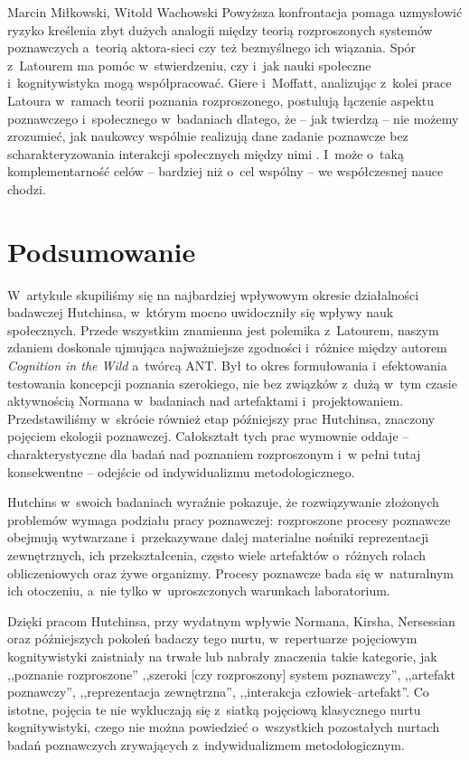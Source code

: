 \begin{artplenv2auth}{Marcin Miłkowski, Witold Wachowski}
Powyższa konfrontacja pomaga uzmysłowić ryzyko kreślenia zbyt dużych analogii między teorią rozproszonych systemów poznawczych a~teorią aktora-sieci czy też bezmyślnego ich wiązania. Spór z~Latourem ma pomóc w~stwierdzeniu, czy i~jak nauki społeczne i~kognitywistyka mogą współpracować. Giere i~Moffatt, analizując z~kolei prace Latoura w~ramach teorii poznania rozproszonego, postulują łączenie aspektu poznawczego i~społecznego w~badaniach dlatego, że -- jak twierdzą -- nie możemy zrozumieć, jak naukowcy wspólnie realizują dane zadanie poznawcze bez scharakteryzowania interakcji społecznych między nimi
\parencite[][s.~4–8]{giere_distributed_2003}. %
 I~może o~taką komplementarność celów -- bardziej niż o~cel wspólny -- we współczesnej nauce chodzi.

\section{Podsumowanie}

W~artykule skupiliśmy się na najbardziej wpływowym okresie działalności badawczej Hutchinsa, w~którym mocno uwidoczniły się wpływy nauk społecznych. Przede wszystkim znamienna jest polemika z~La\-tourem, naszym zdaniem doskonale ujmująca najważniejsze zgodności i~różnice między autorem \textit{Cognition in the Wild} a~twórcą ANT. Był to okres formułowania i~efektowania testowania koncepcji poznania szerokiego, nie bez związków z~dużą w~tym czasie aktywnością Normana w~badaniach nad artefaktami i~projektowaniem. Przedstawiliśmy w~skrócie również etap późniejszy prac Hutchinsa, znaczony pojęciem ekologii poznawczej. Całokształt tych prac wymownie oddaje -- charakterystyczne dla badań nad poznaniem rozproszonym i~w pełni tutaj konsekwentne -- odejście od indywidualizmu metodologicznego.

Hutchins w~swoich badaniach wyraźnie pokazuje, że rozwiązywanie złożonych problemów wymaga podziału pracy poznawczej: rozproszone procesy poznawcze obejmują wytwarzane i~przekazywane dalej materialne nośniki reprezentacji zewnętrznych, ich przekształcenia, często wiele artefaktów o~różnych rolach obliczeniowych oraz żywe organizmy. Procesy poznawcze bada się w~naturalnym ich otoczeniu, a~nie tylko w~uproszczonych warunkach laboratorium.

Dzięki pracom Hutchinsa, przy wydatnym wpływie Normana, Kirsha, Nersessian oraz późniejszych pokoleń badaczy tego nurtu, w~repertuarze pojęciowym kognitywistyki zaistniały na trwałe lub nabrały znaczenia takie kategorie, jak ,,poznanie rozproszone'' ,,szeroki [czy rozproszony] system poznawczy'', ,,artefakt poznawczy'', ,,reprezentacja zewnętrzna'', ,,interakcja człowiek–artefakt''. Co istotne, pojęcia te nie wykluczają się z~siatką pojęciową klasycznego nurtu kognitywistyki, czego nie można powiedzieć o~wszystkich pozostałych nurtach badań poznawczych zrywających z~indywidualizmem metodologicznym.


\end{artplenv2auth}
